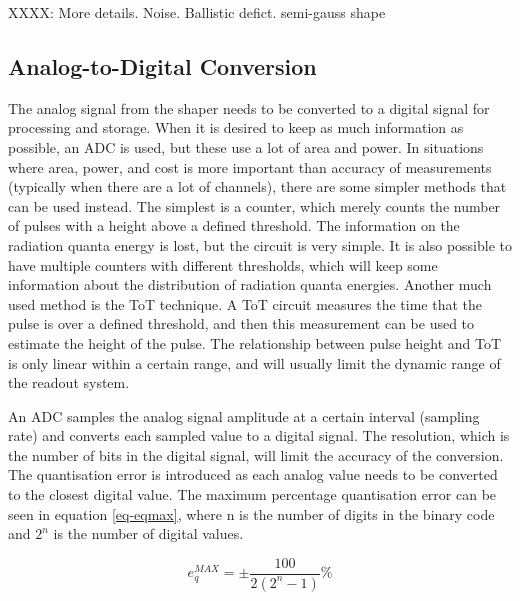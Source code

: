 \documentclass[../main/thesis.tex]{subfiles}
\begin{document}
XXXX: More details. Noise. Ballistic defict. semi-gauss shape

\subsection{Analog-to-Digital Conversion}
\label{t-adc}
The analog signal from the shaper needs to be converted to a digital signal for processing and storage. When it is desired to keep as much information as possible, an \gls{ADC} is used, but these use a lot of area and power. In situations where area, power, and cost is more important than accuracy of measurements (typically when there are a lot of channels), there are some simpler methods that can be used instead. The simplest is a counter, which merely counts the number of pulses with a height above a defined threshold. The information on the radiation quanta energy is lost, but the circuit is very simple. It is also possible to have multiple counters with different thresholds, which will keep some information about the distribution of radiation quanta energies. Another much used method is the \gls{ToT} technique. A \gls{ToT} circuit measures the time that the pulse is over a defined threshold, and then this measurement can be used to estimate the height of the pulse. The relationship between pulse height and \gls{ToT} is only linear within a certain range, and will usually limit the dynamic range of the readout system. \citep[chap. 6]{ToT}


An \gls{ADC} samples the analog signal amplitude at a certain interval (sampling rate) and converts each sampled value to a digital signal. The resolution, which is the number of bits in the digital signal, will limit the accuracy of the conversion. The quantisation error is introduced as each analog value needs to be converted to the closest digital value. The maximum percentage quantisation error can be seen in equation \ref{eq-eqmax}, where n is the number of digits in the binary code and $2^n$ is the number of digital values. \citep[chap. 10]{Bentley}

\begin{equation}%
e_q^{MAX} = \pm \frac{100}{2(2^n - 1)}\%
\label{eq-eqmax}
\end{equation}
\end{document}
